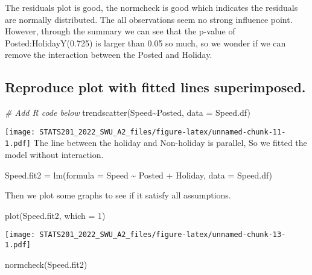 \documentclass[
]{article}
\newenvironment{Shaded}{\begin{snugshade}}{\end{snugshade}}
\newcommand{\AttributeTok}[1]{\textcolor[rgb]{0.77,0.63,0.00}{#1}}
\newcommand{\CommentTok}[1]{\textcolor[rgb]{0.56,0.35,0.01}{\textit{#1}}}
\newcommand{\DecValTok}[1]{\textcolor[rgb]{0.00,0.00,0.81}{#1}}
\newcommand{\FunctionTok}[1]{\textcolor[rgb]{0.00,0.00,0.00}{#1}}
\newcommand{\NormalTok}[1]{#1}
\newcommand{\OtherTok}[1]{\textcolor[rgb]{0.56,0.35,0.01}{#1}}
\newcommand{\SpecialCharTok}[1]{\textcolor[rgb]{0.00,0.00,0.00}{#1}}
\begin{document}
The residuals plot is good, the normcheck is good which indicates the
residuals are normally distributed. The all observations seem no strong
influence point.\\
However, through the summary we can see that the p-value of
Posted:HolidayY(0.725) is larger than 0.05 so much, so we wonder if we
can remove the interaction between the Posted and Holiday.

\hypertarget{reproduce-plot-with-fitted-lines-superimposed.}{%
\subsection{Reproduce plot with fitted lines
superimposed.}\label{reproduce-plot-with-fitted-lines-superimposed.}}

\begin{Shaded}
\begin{Highlighting}[]
\CommentTok{\# Add R code below}
\FunctionTok{trendscatter}\NormalTok{(Speed}\SpecialCharTok{\textasciitilde{}}\NormalTok{Posted, }\AttributeTok{data =}\NormalTok{ Speed.df)}
\end{Highlighting}
\end{Shaded}

\texttt{[image: STATS201\_2022\_SWU\_A2\_files/figure-latex/unnamed-chunk-11-1.pdf]}
The line between the holiday and Non-holiday is parallel, So we fitted
the model without interaction.

\begin{Shaded}
\begin{Highlighting}[]
\NormalTok{Speed.fit2 }\OtherTok{=} \FunctionTok{lm}\NormalTok{(}\AttributeTok{formula =}\NormalTok{ Speed }\SpecialCharTok{\textasciitilde{}}\NormalTok{ Posted }\SpecialCharTok{+}\NormalTok{ Holiday, }\AttributeTok{data =}\NormalTok{ Speed.df)}
\end{Highlighting}
\end{Shaded}

Then we plot some graphs to see if it satisfy all assumptions.

\begin{Shaded}
\begin{Highlighting}[]
\FunctionTok{plot}\NormalTok{(Speed.fit2, }\AttributeTok{which =} \DecValTok{1}\NormalTok{)}
\end{Highlighting}
\end{Shaded}

\texttt{[image: STATS201\_2022\_SWU\_A2\_files/figure-latex/unnamed-chunk-13-1.pdf]}

\begin{Shaded}
\begin{Highlighting}[]
\FunctionTok{normcheck}\NormalTok{(Speed.fit2)}
\end{Highlighting}
\end{Shaded}
\end{document}
